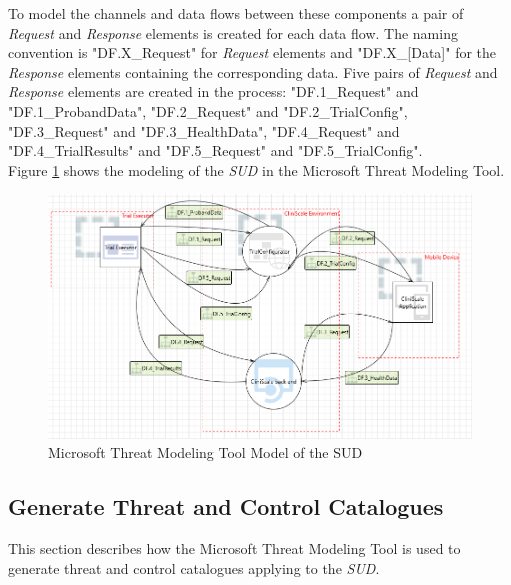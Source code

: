 To model the channels and data flows between these components a pair of \textit{Request} and \textit{Response} elements is created for each data flow. The naming convention is "DF.X\_Request" for \textit{Request} elements and "DF.X\_[Data]" for the \textit{Response} elements containing the corresponding data. Five pairs of \textit{Request} and \textit{Response} elements are created in the process: "DF.1\_Request" and "DF.1\_ProbandData", "DF.2\_Request" and "DF.2\_TrialConfig", "DF.3\_Request" and "DF.3\_HealthData", "DF.4\_Request" and "DF.4\_TrialResults" and "DF.5\_Request" and "DF.5\_TrialConfig".
\\
Figure \ref{fig:mtmtmodel} shows the modeling of the \textit{SUD} in the Microsoft Threat Modeling Tool.
\begin{figure}[H]
  \includegraphics[width=\linewidth]{images/mtmt_model.PNG}
  \caption{Microsoft Threat Modeling Tool Model of the SUD}
  \label{fig:mtmtmodel}
\end{figure}


\subsection{Generate Threat and Control Catalogues}
This section describes how the Microsoft Threat Modeling Tool is used to generate threat and control catalogues applying to the \textit{SUD}.\\

